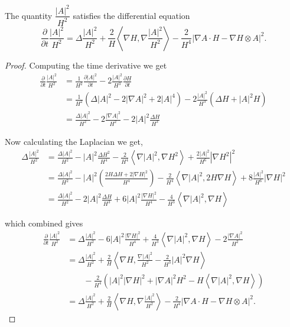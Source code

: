 \begin{lemma}\label{Deltag1}
    The quantity $ \dfrac{|A|^{2}}{H^{2}} $ satisfies the differential equation 
    \begin{equation}
        \frac{\partial}{ \partial t} \frac{|A|^{2}}{H^{2}} = \Delta \frac{|A|^{2}}{H^{2}}+ \frac{2}{H} \left< \nabla H , \nabla \frac{ |A|^{2}}{H^{2}}\right>  - \frac{2}{H^{4}}|\nabla A \cdot H - \nabla H \otimes A|^{2}.
    \end{equation}
\end{lemma}
\begin{proof}
    Computing the time derivative we get 
    \begin{align*}
        \frac{\partial}{ \partial t} \frac{|A|^{2}}{H^{2}} & = \frac{1}{H^{2}} \frac{ \partial |A|^{2} }{ \partial t} - 2\frac{|A|^{2}}{H^{3}} \frac{ \partial H}{ \partial t}\\
        & = \frac{1}{H^{2}}\left( \Delta |A|^{2} - 2|\nabla A|^{2}+2|A|^{4}\right) - 2 \frac{|A|^{2}}{H^{3}}\left( \Delta  H + |A|^{2}H\right)\\
        & = \frac{\Delta |A|^{2}}{H^{2}} - 2 \frac{|\nabla A|^{2}}{H^{2}} - 2|A|^{2} \frac{\Delta H}{H^{3}} 
    \end{align*}

    Now calculating the Laplacian we get, \begin{align*}
        \Delta \frac{|A|^{2}}{H^{2}} & = \frac{\Delta |A|^{2}}{H^{2}} - |A|^{2}\frac{ \Delta H^{2}}{H^{4}} - \frac{2}{H^{4}} \left< \nabla |A|^{2}, \nabla H^{2} \right> + \frac{2|A|^{2}}{H^{6}}|\nabla H^{2}|^{2}\\
        & = \frac{\Delta |A|^{2}}{H^{2}} - |A|^{2} \left( \frac{2H \Delta H+ 2| \nabla H|^{2}}{H^{4}} \right)- \frac{2}{H^{4}}\left< \nabla |A|^{2}, 2H \nabla H \right> + 8 \frac{|A|^{2}}{H^{6}}|\nabla H|^{2}\\
        & = \frac{\Delta |A|^{2}}{{H^{2}}} - 2|A|^{2} \frac{\Delta H}{H^{3}} + 6|A|^{2} \frac{| \nabla H|^{2}}{H^{4}} - \frac{4}{H^{3}}\left< \nabla |A|^{2}, \nabla H \right>
    \end{align*}

    which combined gives \begin{align*}
        \frac{\partial}{ \partial t} \frac{|A|^{2}}{H^{2}} & = \Delta \frac{|A|^{2}}{H^{2}}  - 6|A|^{2} \frac{| \nabla H|^{2}}{H^{4}} + \frac{4}{H^{3}}\left< \nabla |A|^{2}, \nabla H \right> -2 \frac{|\nabla A|^{2}}{H^{2}}\\
        & = \Delta \frac{|A|^{2}}{H^{2}} + \frac{2}{H} \left< \nabla H, \frac{\nabla |A|^{2}}{H^{2}} - \frac{2}{H^{3}}|A|^{2} \nabla H \right>  \\
        & \qquad - \frac{2}{H^{4}}\left( |A|^{2}|\nabla H|^{2} + | \nabla A|^{2}H^{2} - H\left< \nabla |A|^{2}, \nabla H \right> \right) \\
        & = \Delta \frac{|A|^{2}}{H^{2}}+ \frac{2}{H} \left< \nabla H , \nabla \frac{ |A|^{2}}{H^{2}}\right>  - \frac{2}{H^{4}}|\nabla A \cdot H - \nabla H \otimes A|^{2}.
    \end{align*}
\end{proof} 

